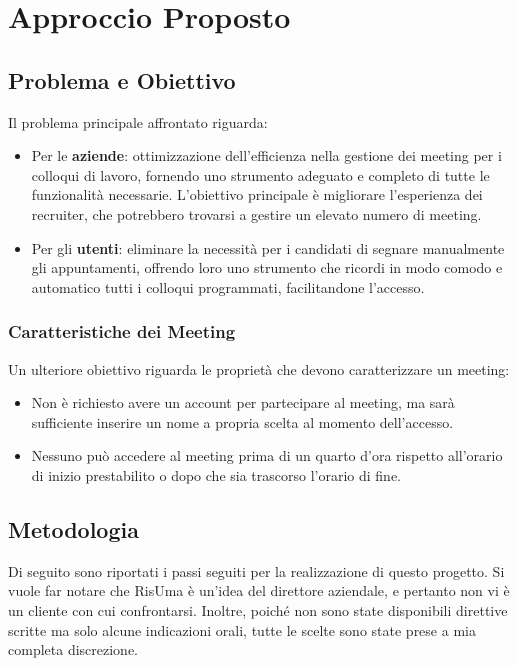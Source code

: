 \chapter{Approccio Proposto}
\section{Problema e Obiettivo}
Il problema principale affrontato riguarda:

\begin{itemize}
   \item Per le \textbf{aziende}: ottimizzazione dell'efficienza nella gestione dei meeting per i colloqui di lavoro, 
   fornendo uno strumento adeguato e completo di tutte le funzionalità necessarie. 
   L'obiettivo principale è migliorare l'esperienza dei recruiter, che potrebbero trovarsi a gestire un elevato numero di meeting.

    \item Per gli \textbf{utenti}: eliminare la necessità per i candidati di segnare manualmente gli appuntamenti, 
    offrendo loro uno strumento che ricordi in modo comodo e automatico tutti i colloqui programmati, facilitandone l'accesso.
 \end{itemize}

   \subsection{Caratteristiche dei Meeting}
   \label{sec:caratteristiche_meeting}
   Un ulteriore obiettivo riguarda le proprietà che devono caratterizzare un meeting:

      \begin{itemize}
         \item Non è richiesto avere un account per partecipare al meeting, ma sarà sufficiente inserire un nome a propria scelta al momento dell'accesso.
         
         \item Nessuno può accedere al meeting prima di un quarto d'ora rispetto all'orario di inizio prestabilito o dopo che sia trascorso l'orario di fine.
      \end{itemize}

\section{Metodologia}
Di seguito sono riportati i passi seguiti per la realizzazione di questo progetto.
Si vuole far notare che RisUma è un'idea del direttore aziendale, 
e pertanto non vi è un cliente con cui confrontarsi. Inoltre, poiché non sono state disponibili direttive scritte ma solo 
alcune indicazioni orali, tutte le scelte sono state prese a mia completa discrezione.

